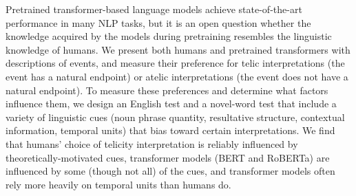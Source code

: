 Pretrained transformer-based language models achieve state-of-the-art performance in many NLP tasks, but it is an open question whether the knowledge acquired by the models during pretraining resembles the linguistic knowledge of humans. We present both humans and pretrained transformers with descriptions of events, and measure their preference for telic interpretations (the event has a natural endpoint) or atelic interpretations (the event does not have a natural endpoint). To measure these preferences and determine what factors influence them, we design an English test and a novel-word test that include a variety of linguistic cues (noun phrase quantity, resultative structure, contextual information, temporal units) that bias toward certain interpretations. We find that humans' choice of telicity interpretation is reliably influenced by theoretically-motivated cues, transformer models (BERT and RoBERTa) are influenced by some (though not all) of the cues, and transformer models often rely more heavily on temporal units than humans do.
